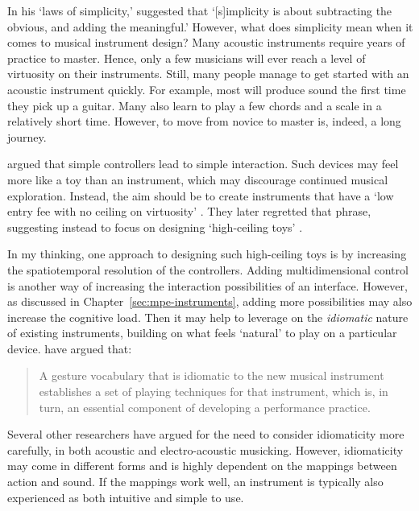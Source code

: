 In his `laws of simplicity,' \citet[89]{maeda_laws_2006} suggested that `[s]implicity is about subtracting the obvious, and adding the meaningful.' However, what does simplicity mean when it comes to musical instrument design? Many acoustic instruments require years of practice to master. Hence, only a few musicians will ever reach a level of virtuosity on their instruments. Still, many people manage to get started with an acoustic instrument quickly. For example, most will produce sound the first time they pick up a guitar. Many also learn to play a few chords and a scale in a relatively short time. However, to move from novice to master is, indeed, a long journey.

\citet{wessel_problems_2001} argued that simple controllers lead to simple interaction. Such devices may feel more like a toy than an instrument, which may discourage continued musical exploration. Instead, the aim should be to create instruments that have a `low entry fee with no ceiling on virtuosity' \citep{wright_problems_2002}. They later regretted that phrase, suggesting instead to focus on designing `high-ceiling toys' \citep{jensenius_unsolved_2017}.

In my thinking, one approach to designing such high-ceiling toys is by increasing the spatiotemporal resolution of the controllers. Adding multidimensional control is another way of increasing the interaction possibilities of an interface. However, as discussed in Chapter~\ref{sec:mpe-instruments}, adding more possibilities may also increase the cognitive load. Then it may help to leverage on the \emph{idiomatic} nature of existing instruments, building on what feels `natural' to play on a particular device. \citet{tahiroglu_contextualising_2018} have argued that:

\begin{quotation}
A gesture vocabulary that is idiomatic to the new musical instrument establishes a set of playing techniques for that instrument, which is, in turn, an essential component of developing a performance practice.
\end{quotation}

Several other researchers have argued for the need to consider idiomaticity more carefully, in both acoustic \citep{aho_tangible_2016, de_souza_music_2017} and electro-acoustic \citep{frisk_improvisation_2008,mcpherson_idiomatic_2020} musicking. However, idiomaticity may come in different forms and is highly dependent on the mappings between action and sound. If the mappings work well, an instrument is typically also experienced as both intuitive and simple to use.

